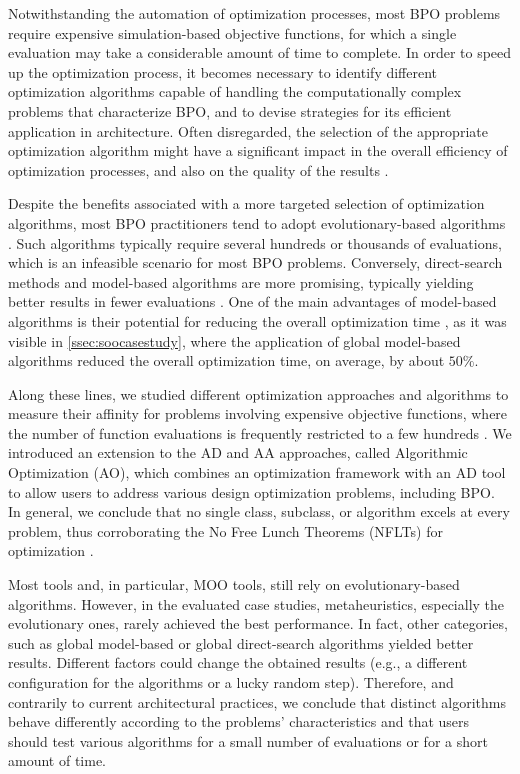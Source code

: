 Notwithstanding the automation of optimization processes, most \ac{BPO} problems require expensive simulation-based objective functions, for which a single evaluation may take a considerable amount of time to complete. In order to speed up the optimization process, it becomes necessary to identify different optimization algorithms capable of handling the computationally complex problems that characterize \ac{BPO}, and to devise strategies for its efficient application in architecture. Often disregarded, the selection of the appropriate optimization algorithm might have a significant impact in the overall efficiency of optimization processes, and also on the quality of the results \cite{Wolpert1997NFLT}. 

Despite the benefits associated with a more targeted selection of optimization algorithms, most \ac{BPO} practitioners tend to adopt evolutionary-based algorithms \cite{Evins2013, Nguyen2014}. Such algorithms typically require several hundreds or thousands of evaluations, which is an infeasible scenario for most \ac{BPO} problems. Conversely, direct-search methods and model-based algorithms are more promising, typically yielding better results in fewer evaluations \cite{Waibel2018}. One of the main advantages of model-based algorithms is their potential for reducing the overall optimization time \cite{Wortmann2017GABESTCHOICE}, as it was visible in \cref{ssec:soocasestudy}, where the application of global model-based algorithms reduced the overall optimization time, on average, by about $50\%$. 

Along these lines, we studied different optimization approaches and algorithms to measure their affinity for problems involving expensive objective functions, where the number of function evaluations is frequently restricted to a few hundreds \cite{Caetano2018,Belem2018optimizeddesign,Belem2019MOO,IP2019MOO}. We introduced an extension to the \ac{AD} and \ac{AA} approaches, called Algorithmic Optimization (\ac{AO}), which combines an optimization framework with an \ac{AD} tool to allow users to address various design optimization problems, including \ac{BPO}. In general, we conclude that no single class, subclass, or algorithm excels at every problem, thus corroborating the No Free Lunch Theorems (\acp{NFLT}) for optimization \cite{Wolpert1997NFLT}.  

Most tools and, in particular, \ac{MOO} tools, still rely on evolutionary-based algorithms. However, in the evaluated case studies, metaheuristics, especially the evolutionary ones, rarely achieved the best performance. In fact, other categories, such as global model-based or global direct-search algorithms yielded better results. Different factors could change the obtained results (e.g., a different configuration for the algorithms or a lucky random step). Therefore, and contrarily to current architectural practices, we conclude that distinct algorithms behave differently according to the problems' characteristics and that users should test various algorithms for a small number of evaluations or for a short amount of time. 

